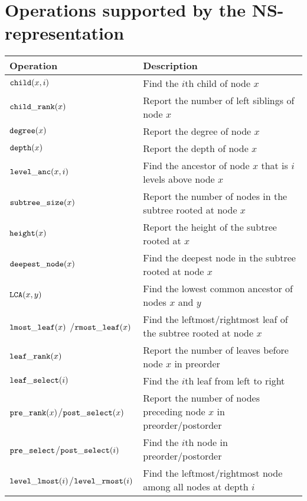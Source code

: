 \section{Operations supported by the NS-representation}
\label{sec:operations}

\begin{table}[h]
\setlength{\tabcolsep}{0pt}
\begin{center}
\begin{tabular} {l@{\hspace{1em}}>{\raggedright\arraybackslash}p{7.2cm}}
\toprule
\textbf{Operation}                 & \textbf{Description}        \\
\midrule
$\mathtt{child}(x,i)$                      & Find the $i$th child of node $x$\\
$\mathtt{child\_rank}(x)$                    & Report the number of left siblings of node $x$\\
$\mathtt{degree}(x)$                       & Report the degree of node $x$\\
$\mathtt{depth}(x)$                        & Report the depth of node $x$\\
$\mathtt{level\_anc}(x,i)$                   & Find the ancestor of node $x$ that is $i$ levels above node $x$\\
$\mathtt{subtree\_size}(x)$                  & Report the number of nodes in the subtree rooted at node $x$\\
$\mathtt{height}(x)$                       & Report the height of the subtree rooted at $x$\\
$\mathtt{deepest\_node}(x)$                  & Find the deepest node in the subtree rooted at node $x$\\
$\mathtt{LCA}(x,y)$                        & Find the lowest common ancestor of nodes $x$ and $y$ \\
$\mathtt{lmost\_leaf}(x)$ /$\mathtt{rmost\_leaf}(x)$   & Find the leftmost/rightmost leaf of the subtree rooted at node $x$\\
$\mathtt{leaf\_rank}(x)$                     & Report the number of leaves before node $x$ in preorder\\
$\mathtt{leaf\_select}(i)$                   & Find the $i$th leaf from left to right\\
$\mathtt{pre\_rank}(x)$/$\mathtt{post\_select}(x)$       & Report the number of nodes preceding node $x$ in preorder/postorder\\
$\mathtt{pre\_select}$/$\mathtt{post\_select}(i)$      & Find the $i$th node in preorder/postorder\\       
$\mathtt{level\_lmost}(i)$/$\mathtt{level\_rmost}(i)$  & Find the leftmost/rightmost node among all nodes at depth $i$\\

\end{tabular}
\end{center}
\end{table}
